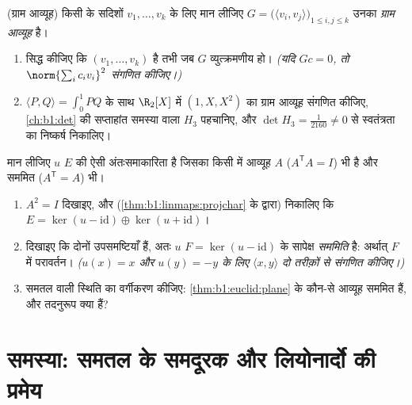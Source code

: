 \begin{exercise}[$\star\star$]\label{exo:b1:euclid:11}
(ग्राम आव्यूह) किसी  के सदिशों $v_1, \dots, v_k$ के लिए मान
लीजिए $G = \bigl(\langle v_i, v_j\rangle\bigr)_{1 \leq i, j \leq k}$ उनका
\emph{ग्राम आव्यूह} है।
\begin{enumerate}
  \item सिद्ध कीजिए कि $(v_1, \dots, v_k)$  है तभी जब $G$
  व्युत्क्रमणीय हो। \emph{(यदि $Gc = 0$, तो $\norm{\sum_i c_i v_i}^2$ संगणित
  कीजिए।)}
  \item $\langle P, Q\rangle = \int_0^1 PQ$ के साथ $\R_2[X]$ में $(1, X,
  X^2)$ का ग्राम आव्यूह संगणित कीजिए, \cref{ch:b1:det} की सप्ताहांत समस्या
  वाला  $H_3$ पहचानिए, और $\det H_3 = \frac1{2160} \neq 0$ से
  स्वतंत्रता का निष्कर्ष निकालिए।
\end{enumerate}
\end{exercise}

\begin{exercise}[$\star\star\star$]\label{exo:b1:euclid:12}
मान लीजिए $u$  $E$ की ऐसी अंतःसमाकारिता है जिसका किसी
  में आव्यूह $A$  ($A^{\mathsf T}A = I$) भी है और
सममित ($A^{\mathsf T} = A$) भी।
\begin{enumerate}
  \item $A^2 = I$ दिखाइए, और (\cref{thm:b1:linmaps:projchar} के द्वारा)
  निकालिए कि $E = \ker(u - \mathrm{id}) \oplus \ker(u + \mathrm{id})$।
  \item दिखाइए कि दोनों उपसमष्टियाँ  हैं, अतः $u$ $F = \ker(u -
  \mathrm{id})$ के सापेक्ष \emph{ सममिति} है: अर्थात् $F$ में
  परावर्तन। \emph{($u(x) = x$ और $u(y) = -y$ के लिए $\langle x, y\rangle$ दो
  तरीक़ों से संगणित कीजिए।)}
  \item समतल वाली स्थिति का वर्गीकरण कीजिए: \cref{thm:b1:euclid:plane} के
  कौन-से आव्यूह सममित हैं, और तदनुरूप  क्या हैं?
\end{enumerate}
\end{exercise}

\section{समस्या: समतल के समदूरक और लियोनार्दो की प्रमेय}

